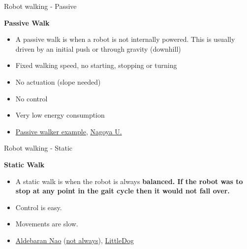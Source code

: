 \documentclass[compress]{beamer}
\begin{document}
\begin{frame}{Robot walking - Passive}

    \textbf{Passive Walk}

    \begin{itemize}

        \item A passive walk is when a robot is not internally powered. This is
            usually driven by an initial push or through gravity (downhill)
        \item Fixed walking speed, no starting, stopping or turning
        \item No actuation (slope needed)
        \item No control
        \item Very low energy consumption
        \item \href{http://www.youtube.com/watch?v=N64KOQkbyiI}{Passive walker
            example},
            \href{http://www.youtube.com/watch?v=CK8IFEGmiKY\&NR=1}{Nagoya U.}
    \end{itemize}

\end{frame}

\begin{frame}{Robot walking - Static}

    \textbf{Static Walk}

    \begin{itemize}

        \item A static walk is when the robot is always \textbf{balanced. If the
            robot was to stop at any point in the gait cycle then it would not
            fall over.}
        \item Control is easy.
        \item Movements are slow.
        \item \href{http://www.youtube.com/watch?v=NbnELOZbsls\&feature=related}{Aldebaran
            Nao} (\href{http://www.youtube.com/watch?v=3aOuQ1_e--k}{not always}),
            \href{http://www.youtube.com/watch?v=cYo9Whssla8}{LittleDog}
    \end{itemize}

\end{frame}
\end{document}
